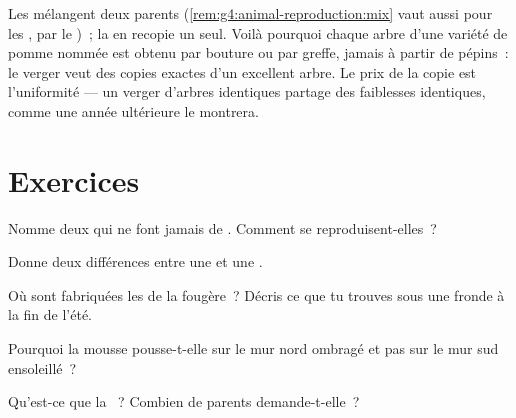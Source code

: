 \begin{remark}\label{rem:g4:plants-without-seeds:copy}
Les  mélangent deux parents
(\cref{rem:g4:animal-reproduction:mix} vaut aussi pour les ,
par le )~; la  en recopie un seul. Voilà
pourquoi chaque arbre d'une variété de pomme nommée est obtenu par
bouture ou par greffe, jamais à partir de pépins~: le verger veut
des copies exactes d'un excellent arbre. Le prix de la copie est
l'uniformité --- un verger d'arbres identiques partage des
faiblesses identiques, comme une année ultérieure le montrera.
\end{remark}

\section{Exercices}

\begin{exercise}[$\star$]\label{exo:g4:plants-without-seeds:1}
Nomme deux  qui ne font jamais de . Comment se
reproduisent-elles~?
\end{exercise}

\begin{exercise}[$\star$]\label{exo:g4:plants-without-seeds:2}
Donne deux différences entre une  et une .
\end{exercise}

\begin{exercise}[$\star$]\label{exo:g4:plants-without-seeds:3}
Où sont fabriquées les  de la fougère~? Décris ce que tu
trouves sous une fronde à la fin de l'été.
\end{exercise}

\begin{exercise}[$\star$]\label{exo:g4:plants-without-seeds:4}
Pourquoi la mousse pousse-t-elle sur le mur nord ombragé et pas sur
le mur sud ensoleillé~?
\end{exercise}

\begin{exercise}[$\star$]\label{exo:g4:plants-without-seeds:5}
Qu'est-ce que la ~? Combien de parents
demande-t-elle~?
\end{exercise}

